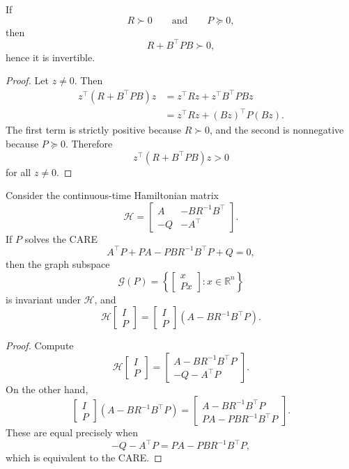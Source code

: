 \begin{proposition}\label{prop:l6-invertibility-of}
	If
	\[
		R \succ 0
		\qquad \text{and} \qquad
		P \succeq 0,
	\]
	then
	\[
		R+B^\top P B \succ 0,
	\]
	hence it is invertible.
\end{proposition}
\begin{proof}
	Let $z \ne 0$. Then
	\begin{align*}
		z^\top(R+B^\top P B)z
		&= z^\top R z + z^\top B^\top P B z \\
		&= z^\top R z + (Bz)^\top P(Bz).
	\end{align*}
	The first term is strictly positive because $R \succ 0$, and the second is nonnegative because $P \succeq 0$. Therefore
	\[
		z^\top(R+B^\top P B)z > 0
	\]
	for all $z \ne 0$.
\end{proof}

\begin{theorem}\label{thm:l6-hamiltonian-matrix-connection-for-continuous-time-lqr}
	Consider the continuous-time Hamiltonian matrix
	\[
		\mathcal{H}
		=
		\begin{bmatrix}
			A & -B R^{-1}B^\top \\
			-Q & -A^\top
		\end{bmatrix}.
	\]
	If $P$ solves the CARE
	\[
		A^\top P + P A - P B R^{-1}B^\top P + Q = 0,
	\]
	then the graph subspace
	\[
		\mathcal{G}(P)=\left\{
		\begin{bmatrix}
			x \\
			Px
		\end{bmatrix}
		: x \in \mathbb{R}^n
		\right\}
	\]
	is invariant under $\mathcal{H}$, and
	\[
		\mathcal{H}
		\begin{bmatrix}
			I \\
			P
		\end{bmatrix}
		=
		\begin{bmatrix}
			I \\
			P
		\end{bmatrix}
		(A-BR^{-1}B^\top P).
	\]
\end{theorem}
\begin{proof}
	Compute
	\[
		\mathcal{H}
		\begin{bmatrix}
			I \\
			P
		\end{bmatrix}
		=
		\begin{bmatrix}
			A-BR^{-1}B^\top P \\
			-Q-A^\top P
		\end{bmatrix}.
	\]
	On the other hand,
	\[
		\begin{bmatrix}
			I \\
			P
		\end{bmatrix}
		(A-BR^{-1}B^\top P)
		=
		\begin{bmatrix}
			A-BR^{-1}B^\top P \\
			PA-PBR^{-1}B^\top P
		\end{bmatrix}.
	\]
	These are equal precisely when
	\[
		-Q-A^\top P = PA-PBR^{-1}B^\top P,
	\]
	which is equivalent to the CARE.
\end{proof}

